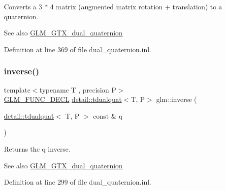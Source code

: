 Converts a 3 $\ast$ 4 matrix (augmented matrix rotation + translation) to a quaternion.

\begin{DoxySeeAlso}{See also}
\hyperlink{group__gtc__dual__quaternion}{G\+L\+M\+\_\+\+G\+T\+X\+\_\+dual\+\_\+quaternion} 
\end{DoxySeeAlso}


Definition at line 369 of file dual\+\_\+quaternion.\+inl.

\mbox{\label{group__gtc__dual__quaternion_gaad6b9faeb1134c04defae01426a777f8}} 
\subsubsection{\texorpdfstring{inverse()}{inverse()}}
{\footnotesize\ttfamily template$<$typename T , precision P$>$ \\
\hyperlink{setup_8hpp_ab2d052de21a70539923e9bcbf6e83a51}{G\+L\+M\+\_\+\+F\+U\+N\+C\+\_\+\+D\+E\+CL} \hyperlink{structglm_1_1detail_1_1tdualquat}{detail\+::tdualquat}$<$T, P$>$ glm\+::inverse (\begin{DoxyParamCaption}\item[{\hyperlink{structglm_1_1detail_1_1tdualquat}{detail\+::tdualquat}$<$ T, P $>$ const \&}]{q }\end{DoxyParamCaption})}

Returns the q inverse.

\begin{DoxySeeAlso}{See also}
\hyperlink{group__gtc__dual__quaternion}{G\+L\+M\+\_\+\+G\+T\+X\+\_\+dual\+\_\+quaternion} 
\end{DoxySeeAlso}


Definition at line 299 of file dual\+\_\+quaternion.\+inl.

\mbox{\label{group__gtc__dual__quaternion_ga28cbcf029272d5351d4695b8610de126}} 
